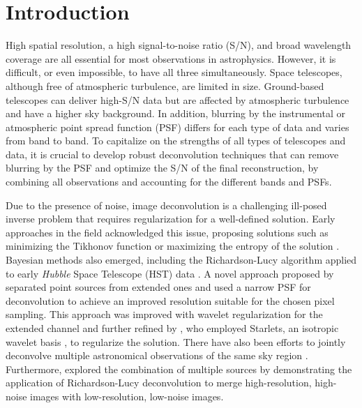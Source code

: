 \documentclass[traditabstract]{aa}
\begin{document}

   \maketitle

\section{Introduction}

High spatial resolution, a high signal-to-noise ratio (S/N), and broad wavelength coverage are all essential for most observations in astrophysics. However, it is difficult, or even impossible, to have all three simultaneously. Space telescopes, although free of atmospheric turbulence, are limited in size. Ground-based telescopes can deliver high-S/N data but are affected by atmospheric turbulence and have a higher sky background. In addition, blurring by the instrumental or atmospheric point spread function (PSF) differs for each type of data and varies from band to band. To capitalize on the strengths of all types of telescopes and data, it is crucial to develop robust deconvolution techniques that can remove blurring by the PSF and optimize the S/N of the final reconstruction, by combining all observations and accounting for the different bands and PSFs.

Due to the presence of noise, image deconvolution is a challenging ill-posed inverse problem that requires regularization for a well-defined solution. Early approaches in the field acknowledged this issue, proposing solutions such as minimizing the Tikhonov function \citep{tikhonov1977solutions} or maximizing the entropy of the solution \citep{skilling1984}. Bayesian methods also emerged, including the Richardson-Lucy algorithm applied to early \textit{Hubble} Space Telescope (HST) data \citep{Richardson1972, Lucy1974}. A novel approach proposed by \citet{MCS} separated point sources from extended ones and used a narrow PSF for deconvolution to achieve an improved resolution suitable for the chosen pixel sampling. This approach was improved with wavelet regularization for the extended channel \citep{firedec} and further refined by \citet[STARRED;][]{STARRED}, who employed Starlets, an isotropic wavelet basis \citep{Starck2015}, to regularize the solution. There have also been efforts to jointly deconvolve multiple astronomical observations of the same sky region \citep{Donath2023Jolideco}. Furthermore, \cite{rldec} explored the combination of multiple sources by demonstrating the application of Richardson-Lucy deconvolution to merge high-resolution, high-noise images with low-resolution, low-noise images. 
\end{document}
